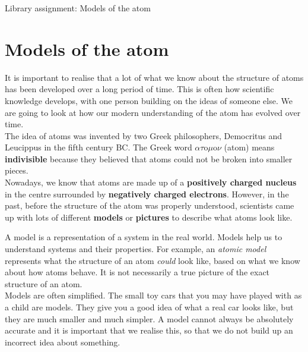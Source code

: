 \begin{project}{Library assignment: Models of the atom}
\begin{minipage}{.4\textwidth}
\end{minipage}

\end{project}

            \section{Models of the atom}
            \nopagebreak
      \label{m38756*id254164}It is important to realise that a lot of what we know about the structure of atoms has been developed over a long period of time. This is often how scientific knowledge develops, with one person building on the ideas of someone else. We are going to look at how our modern understanding of the atom has evolved over time.\\ 
      \label{m38756*id254508}The idea of atoms was invented by two Greek philosophers, Democritus and Leucippus in the fifth century BC. The Greek word $\alpha \tau \text{o}\mu \text{o}\nu$ (atom) means \textbf{indivisible} because they believed that atoms could not be broken into smaller pieces.\\ 
      \label{m38756*id254540}Nowadays, we know that atoms are made up of a \textbf{positively charged nucleus} in the centre
surrounded by \textbf{negatively charged electrons}. However, in the past, before the structure of the atom was properly understood, scientists came up with lots of different \textbf{models} or \textbf{pictures} to describe what atoms look like. 

 { A model is a representation of a system in the real world. Models help us to understand systems and their properties.} 
 For example, an \textsl{atomic model} represents what the structure of an atom \textsl{could} look like, based on what we know about how atoms behave. It is not necessarily a true picture of the exact structure of an atom. \\
Models are often simplified. The small toy cars that you may have played with as a child are models. They give you a good idea of what a real car looks like, but they are much smaller and much simpler. A model cannot always be absolutely accurate and it is important that we realise this, so that we do not build up an incorrect idea about something.

